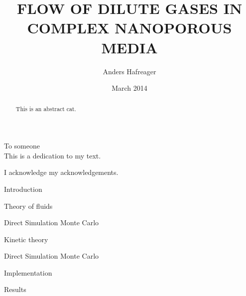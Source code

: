 \documentclass[twoside,english, a4paper, 11pt]{uiofysmaster}
\author{Anders Hafreager}
\title{\uppercase{Flow of dilute gases in complex nanoporous media}}
\date{March 2014}
\begin{document}
\maketitle
\clearpage

\begin{abstract}
This is an abstract cat.
\end{abstract}
\begin{dedication}
To someone
\\\vspace{12pt}
This is a dedication to my text.
\end{dedication}
\begin{acknowledgements}
  I acknowledge my acknowledgements.
\end{acknowledgements}

\tableofcontents
\clearpage
\listoffigures
\clearpage
\listoftables

\begin{chapter}{Introduction}
  
\end{chapter}

\begin{chapter}{Theory of fluids}
  \label{chap:theory_of_fluids}
  
  
\end{chapter}

\begin{part}{Direct Simulation Monte Carlo}
\label{part:dsmc}
\begin{chapter}{Kinetic theory}
  \label{chap:kinetic_theory}
  
  
  
  
\end{chapter}

\begin{chapter}{Direct Simulation Monte Carlo}
  \label{chap:dsmc}
  
  
  
  
  
  
  
  
\end{chapter}
\begin{chapter}{Implementation}
\label{chap:dsmc_implementation}
  
  
  
  
  
\end{chapter}
\begin{chapter}{Results}
  \label{chap:dsmc_results}
  
  
\end{chapter}
\end{part}
\end{document}

